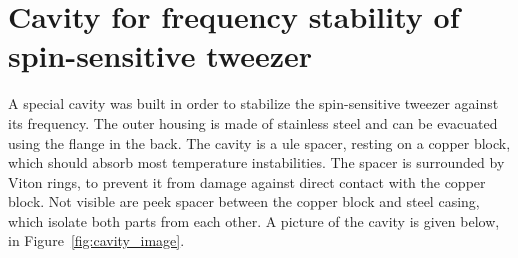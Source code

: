 \appendix
\chapter{Cavity for frequency stability of spin-sensitive tweezer}%
\label{ch:app_cavity}

A special cavity was built in order to stabilize the spin-sensitive tweezer against its frequency. The outer housing is made of stainless steel and can be evacuated using the flange in the back. The cavity is a \ac{ule} spacer, resting on a copper block, which should absorb most temperature instabilities. The spacer is surrounded by Viton rings, to prevent it from damage against direct contact with the copper block. Not visible are peek spacer between the copper block and steel casing, which isolate both parts from each other. A picture of the cavity is given below, in Figure~\ref{fig:cavity_image}.

\begin{figure}[h!]%
\end{figure}
